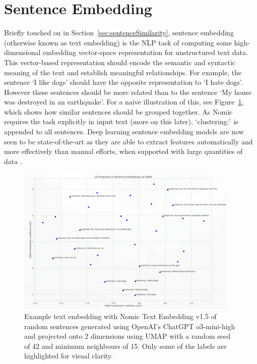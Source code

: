 \documentclass[10pt,oneside]{report}
\begin{document}
\section{Sentence Embedding}\label{sec:sentenceEmbedding}
Briefly touched on in Section~\ref{sec:sentenceSimilarity}, sentence embedding (otherwise known as text embedding) is the NLP task of computing some high-dimensional embedding vector-space representation for unstructured text data. This vector-based representation should encode the semantic and syntactic meaning of the text and establish meaningful relationships. For example, the sentence `I like dogs' should have the opposite representation to `I hate dogs'.  However these sentences should be more related than to the sentence `My house was destroyed in an earthquake'. For a naive illustration of this, see Figure~\ref{fig:sentenceEmbeddingExample}, which shows how similar sentences should be grouped together. As Nomic requires the task explicitly in input text (more on this later), `clustering:' is appended to all sentences. Deep learning sentence embedding models are now seen to be state-of-the-art as they are able to extract features automatically and more effectively than manual efforts, when supported with large quantities of data \cite{liang2017text}.

\begin{figure}[htbp]
    \centering
    \includegraphics[width=0.95\textwidth]{sentenceEmbeddingExample.png}
    \caption{Example text embedding with Nomic Text Embedding v1.5 \cite{nussbaum2024nomic} of random sentences generated using OpenAI's ChatGPT o3-mini-high and projected onto 2 dimensions using UMAP \cite{mcinnes2018umap} with a random seed of 42 and minimum neighbours of 15. Only some of the labels are highlighted for visual clarity.}\label{fig:sentenceEmbeddingExample}
\end{figure}
\end{document}
